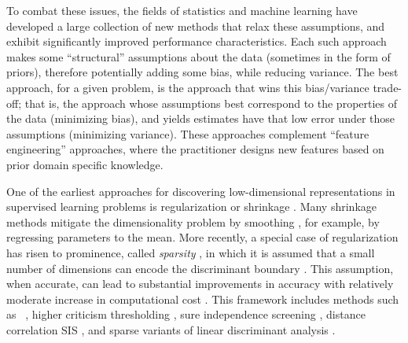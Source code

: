\documentclass[10pt]{article}
\begin{document}
To combat these issues, the fields of statistics and machine learning have developed a large collection of new methods that relax these assumptions, and exhibit significantly improved performance characteristics.  Each such approach makes some ``structural'' assumptions about the data (sometimes in the form of priors), therefore potentially adding some bias, while reducing variance.  The best approach, for a given problem, is the approach that wins this bias/variance trade-off; that is, the approach whose assumptions best correspond to the properties of the data (minimizing bias), and yields estimates have that low error under those assumptions (minimizing variance). These approaches complement ``feature engineering'' approaches, where the practitioner designs new features based on prior domain specific knowledge.



One of the earliest approaches for discovering low-dimensional representations in supervised learning problems is regularization or shrinkage \cite{Friedman1989a,Bickel2004a,Bouveyron2007}.  Many shrinkage methods  mitigate the dimensionality problem by smoothing \cite{Witten2009a}, for example, by regressing parameters to the mean.  More recently, a special case of regularization has risen to prominence, called \emph{sparsity} \cite{Olshausen1997a}, in which it is assumed that a small number of dimensions can encode the discriminant boundary \cite{Tibshirani1996}.  This assumption, when accurate, can lead to substantial improvements in accuracy with relatively moderate increase in computational cost \cite{Efron2004}.  This framework includes methods such as ~\cite{Tibshirani1996}, higher criticism thresholding \cite{Donoho2008a}, sure independence screening \cite{Fan2008}, distance correlation SIS \cite{Li2012},  and sparse variants of linear discriminant analysis \cite{Tibshirani2002a,Fan2008a,Witten2009a,Clemmensen2011a,Mai2013a,Fan2012a}.  
\end{document}
